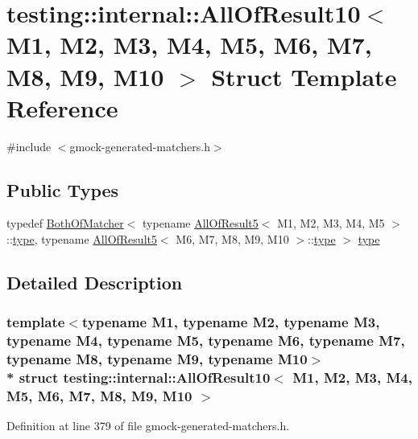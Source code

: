 \hypertarget{structtesting_1_1internal_1_1_all_of_result10}{}\section{testing\+:\+:internal\+:\+:All\+Of\+Result10$<$ M1, M2, M3, M4, M5, M6, M7, M8, M9, M10 $>$ Struct Template Reference}
\label{structtesting_1_1internal_1_1_all_of_result10}


{\ttfamily \#include $<$gmock-\/generated-\/matchers.\+h$>$}

\subsection*{Public Types}
\begin{DoxyCompactItemize}
\item 
typedef \hyperlink{classtesting_1_1internal_1_1_both_of_matcher}{Both\+Of\+Matcher}$<$ typename \hyperlink{structtesting_1_1internal_1_1_all_of_result5}{All\+Of\+Result5}$<$ M1, M2, M3, M4, M5 $>$\+::\hyperlink{structtesting_1_1internal_1_1_all_of_result10_a48d6c6de6d0d5445b212119e1f536af5}{type}, typename \hyperlink{structtesting_1_1internal_1_1_all_of_result5}{All\+Of\+Result5}$<$ M6, M7, M8, M9, M10 $>$\+::\hyperlink{structtesting_1_1internal_1_1_all_of_result10_a48d6c6de6d0d5445b212119e1f536af5}{type} $>$ \hyperlink{structtesting_1_1internal_1_1_all_of_result10_a48d6c6de6d0d5445b212119e1f536af5}{type}
\end{DoxyCompactItemize}


\subsection{Detailed Description}
\subsubsection*{template$<$typename M1, typename M2, typename M3, typename M4, typename M5, typename M6, typename M7, typename M8, typename M9, typename M10$>$\\*
struct testing\+::internal\+::\+All\+Of\+Result10$<$ M1, M2, M3, M4, M5, M6, M7, M8, M9, M10 $>$}



Definition at line 379 of file gmock-\/generated-\/matchers.\+h.



